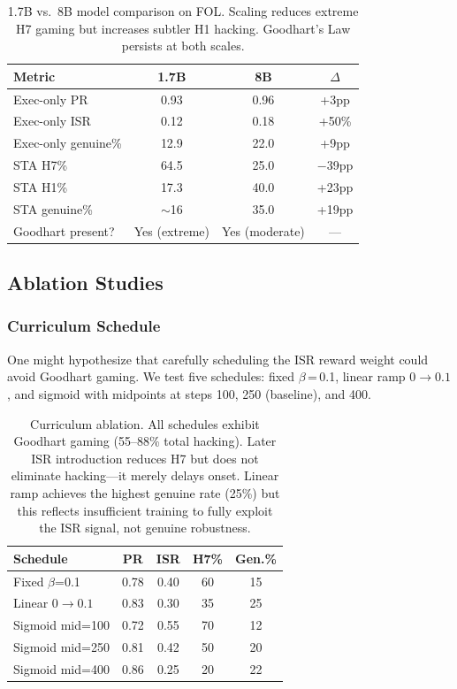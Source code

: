 \documentclass[11pt,a4paper]{article}
\begin{document}
\begin{table}[t]
\centering
\small
\begin{tabular}{lccc}
\toprule
\textbf{Metric} & \textbf{1.7B} & \textbf{8B} & \textbf{$\Delta$} \\
\midrule
Exec-only PR & 0.93 & 0.96 & +3pp \\
Exec-only ISR & 0.12 & 0.18 & +50\% \\
Exec-only genuine\% & 12.9 & 22.0 & +9pp \\
\midrule
STA H7\% & 64.5 & 25.0 & $-$39pp \\
STA H1\% & 17.3 & 40.0 & +23pp \\
STA genuine\% & $\sim$16 & 35.0 & +19pp \\
Goodhart present? & Yes (extreme) & Yes (moderate) & --- \\
\bottomrule
\end{tabular}
\caption{1.7B vs.\ 8B model comparison on FOL. Scaling reduces extreme H7 gaming but increases subtler H1 hacking. Goodhart's Law persists at both scales.}
\label{tab:scale}
\end{table}

\subsection{Ablation Studies}
\label{sec:ablations}

\subsubsection{Curriculum Schedule}
\label{sec:curriculum}

One might hypothesize that carefully scheduling the ISR reward weight could avoid Goodhart gaming.
We test five schedules: fixed $\beta$\,=\,0.1, linear ramp $0 \rightarrow 0.1$, and sigmoid with midpoints at steps 100, 250 (baseline), and 400.

\begin{table}[t]
\centering
\small
\setlength{\tabcolsep}{3pt}
\begin{tabular}{lcccc}
\toprule
\textbf{Schedule} & \textbf{PR} & \textbf{ISR} & \textbf{H7\%} & \textbf{Gen.\%} \\
\midrule
Fixed $\beta$=0.1 & 0.78 & 0.40 & 60 & 15 \\
Linear $0{\rightarrow}0.1$ & 0.83 & 0.30 & 35 & 25 \\
Sigmoid mid=100 & 0.72 & 0.55 & 70 & 12 \\
Sigmoid mid=250 & 0.81 & 0.42 & 50 & 20 \\
Sigmoid mid=400 & 0.86 & 0.25 & 20 & 22 \\
\bottomrule
\end{tabular}
\caption{Curriculum ablation. All schedules exhibit Goodhart gaming (55--88\% total hacking). Later ISR introduction reduces H7 but does not eliminate hacking---it merely delays onset. Linear ramp achieves the highest genuine rate (25\%) but this reflects insufficient training to fully exploit the ISR signal, not genuine robustness.}
\label{tab:curriculum}
\end{table}
\end{document}
